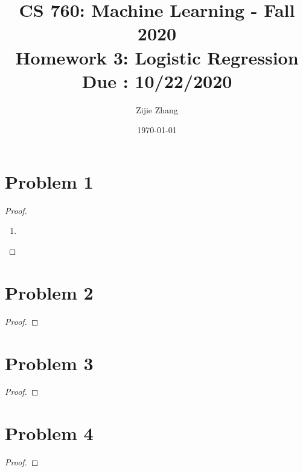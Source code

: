 \documentclass{article}
\title{CS 760: Machine Learning - Fall 2020\\
        {\Large \textbf{Homework 3: Logistic Regression}}\\
        {\normalsize \textbf{Due : 10/22/2020}}
    }
\author{Zijie Zhang}
\date{\today}
\begin{document}
    \maketitle
    
\section*{Problem 1}
    \begin{proof}
    \indent
    \begin{enumerate}[label=(\alph*)]
        \item 
    \end{enumerate}
    \end{proof}

\section*{Problem 2}
    \begin{proof}
    
    \end{proof}

\section*{Problem 3}
    \begin{proof}
        
    \end{proof}

\section*{Problem 4}
    \begin{proof}
        
    \end{proof}
\end{document}
